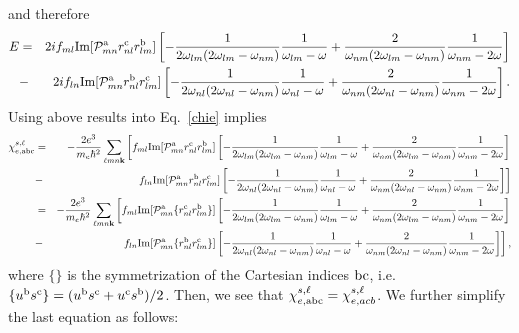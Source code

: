 \documentclass[floatfix,prb,aps,superscriptaddress,11pt,preprint]{revtex4}
\begin{document}
and therefore
\begin{eqnarray}\label{pfen}  
E&=&  
2if_{ml}\mathrm{Im}[{\cal P}^{\mathrm{a}}_{mn}r^{\mathrm{c}}_{nl}r^{\mathrm{b}}_{lm}] 
\left[
-\frac{1}{2\omega_{lm}(2\omega_{lm}-\omega_{nm})}\frac{1}{\omega_{lm}-\omega}
+\frac{2}{\omega_{nm}(2\omega_{lm}-\omega_{nm})}\frac{1}{\omega_{nm}-2\omega}
\right]
\nonumber\\
&-& 
2if_{ln}\mathrm{Im}[{\cal P}^{\mathrm{a}}_{mn}r^{\mathrm{b}}_{nl}r^{\mathrm{c}}_{lm}]
\left[
-\frac{1}{2\omega_{nl}(2\omega_{nl}-\omega_{nm})}\frac{1}{\omega_{nl}-\omega}
+\frac{2}{\omega_{nm}(2\omega_{nl}-\omega_{nm})}\frac{1}{\omega_{nm}-2\omega}
\right]
.
\end{eqnarray}  
Using above results into Eq.~\eqref{chie} implies
\begin{eqnarray}\label{pfen3} 
\chi_{e,\mathrm{a}\mathrm{b}\mathrm{c}}^{s,\ell}
&=& 
-\frac{2e^3}{m_e\hbar^2} 
\sum_{\ell m n\mathbf{k}}
\left[ 
f_{ml}\mathrm{Im}[{\cal P}^{\mathrm{a}}_{mn}r^{\mathrm{c}}_{nl}r^{\mathrm{b}}_{lm}] 
\left[
-\frac{1}{2\omega_{lm}(2\omega_{lm}-\omega_{nm})}\frac{1}{\omega_{lm}-\omega}
+\frac{2}{\omega_{nm}(2\omega_{lm}-\omega_{nm})}\frac{1}{\omega_{nm}-2\omega}
\right]
\right.
\nonumber\\
&-&
\left. 
f_{ln}\mathrm{Im}[{\cal P}^{\mathrm{a}}_{mn}r^{\mathrm{b}}_{nl}r^{\mathrm{c}}_{lm}]
\left[
-\frac{1}{2\omega_{nl}(2\omega_{nl}-\omega_{nm})}\frac{1}{\omega_{nl}-\omega}
+\frac{2}{\omega_{nm}(2\omega_{nl}-\omega_{nm})}\frac{1}{\omega_{nm}-2\omega}
\right]
\right]
\nonumber\\
&=& 
-\frac{2e^3}{m_e\hbar^2} 
\sum_{\ell m n\mathbf{k}}
\left[ 
f_{ml}\mathrm{Im}[{\cal P}^{\mathrm{a}}_{mn}\{r^{\mathrm{c}}_{nl}r^{\mathrm{b}}_{lm}\}] 
\left[
-\frac{1}{2\omega_{lm}(2\omega_{lm}-\omega_{nm})}\frac{1}{\omega_{lm}-\omega}
+\frac{2}{\omega_{nm}(2\omega_{lm}-\omega_{nm})}\frac{1}{\omega_{nm}-2\omega}
\right]
\right.
\nonumber\\
&-&
\left. 
f_{ln}\mathrm{Im}[{\cal P}^{\mathrm{a}}_{mn}\{r^{\mathrm{b}}_{nl}r^{\mathrm{c}}_{lm}\}]
\left[
-\frac{1}{2\omega_{nl}(2\omega_{nl}-\omega_{nm})}\frac{1}{\omega_{nl}-\omega}
+\frac{2}{\omega_{nm}(2\omega_{nl}-\omega_{nm})}\frac{1}{\omega_{nm}-2\omega}
\right]
\right]
,
\end{eqnarray}  
where $\{\}$ is the symmetrization of the Cartesian indices $\mathrm{b}\mathrm{c}$, i.e. 
$\{u^{\mathrm{b}}s^{\mathrm{c}}\}=(u^{\mathrm{b}}s^{\mathrm{c}}+u^{\mathrm{c}}s^{\mathrm{b}})/2$. 
Then, we see that
$\chi_{e,\mathrm{a}\mathrm{b}\mathrm{c}}^{s,\ell}=\chi_{e,acb}^{s,\ell}$. We further simplify 
the last equation as follows:
\end{document}
